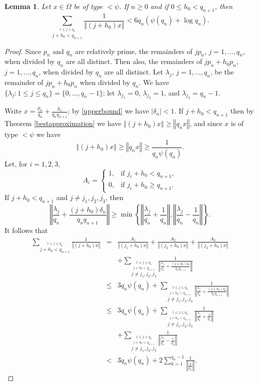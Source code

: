 \documentclass{article}
\newcommand{\norm}[1]{\left\Vert #1 \right\Vert}
\newtheorem{lemma}[theorem]{Lemma}
\begin{document}
\begin{lemma}
Let $x \in \Omega$ be of type $< \psi$. If $n \geq 0$ and if $0 \leq h_0 < q_{n+1}$, then
\[
\sum_{\stackrel{1 \leq j \leq q_n}{j+h_0<q_{n+1}}} \frac{1}{\norm{(j+h_0)x}} < 6 q_n(\psi(q_n)+\log q_n).
\]
\label{h0}
\end{lemma}
\begin{proof}
Since $p_n$ and $q_n$ are relatively prime, 
the remainders of $j p_n$, $j=1,\ldots,q_n$, when divided by $q_n$ are all distinct.
Then also, the remainders of $j p_n+h_0 p_n$, $j=1,\ldots,q_n$, when divided by $q_n$ are all distinct. Let $\lambda_j$, $j=1,\ldots,q_n$, be the remainder of $jp_n+
h_0p_n$  when divided by $q_n$. We have $\{\lambda_j: 1 \leq j \leq q_n\}=\{0,\ldots,q_n-1\}$; let $\lambda_{j_1}=0$, $\lambda_{j_2}=1$, and $\lambda_{j_3}=q_n-1$.


Write $x=\frac{p_n}{q_n}+\frac{\delta_n}{q_n q_{n+1}}$; by \eqref{upperbound} we have $|\delta_n|<1$. If $j+h_0<q_{n+1}$ then by
Theorem \ref{bestapproximation} we have $\norm{(j+h_0)x} \geq \norm{q_n x}$, 
and since $x$ is of type $<\psi$ we have
\[
\norm{(j+h_0)x} \geq \norm{q_n x} \geq \frac{1}{q_n \psi(q_n)}.
\] 
Let, for $i=1,2,3$,
\[
A_i=\begin{cases}
1,&\textrm{if $j_i+h_0<q_{n+1}$},\\
0,&\textrm{if $j_i+h_0 \geq q_{n+1}$}.
\end{cases}
\]
If $j+h_0<q_{n+1}$ and $j \neq j_1,j_2,j_3$, then 
\[\norm{\frac{\lambda_j}{q_n}+\frac{(j+h_0)\delta_n}{q_n q_{n+1}}} \geq \min \left\{ \norm{\frac{\lambda_j}{q_n}+\frac{1}{q_n}},\norm{\frac{\lambda_j}{q_n}-\frac{1}{q_n}}  \right\}.
\]
It follows that
\begin{eqnarray*}
\sum_{\stackrel{1 \leq j \leq q_n}{j+h_0<q_{n+1}}} \frac{1}{\norm{(j+h_0)x}}
&=&
\frac{A_1}{\norm{(j_1+h_0)x}}
+
\frac{A_2}{\norm{(j_2+h_0)x}}
+\frac{A_3}{\norm{(j_3+h_0)x}}\\
&&+
\sum_{\stackrel{1 \leq j \leq q_n}{\stackrel{j+h_0<q_{n+1}}{j \neq j_1, j_2, j_3}}} \frac{1}{\norm{\frac{\lambda_j}{q_n}+\frac{(j+h_0)\delta_n}{q_n q_{n+1}}}}\\
&\leq&3q_n\psi(q_n)+\sum_{\stackrel{1 \leq j \leq q_n}{\stackrel{j+h_0<q_{n+1}}{j \neq j_1, j_2, j_3}}} \frac{1}{\norm{\frac{\lambda_j}{q_n}+\frac{(j+h_0)\delta_n}{q_n q_{n+1}}}}\\
&\leq&3q_n\psi(q_n)+\sum_{\stackrel{1 \leq j \leq q_n}{\stackrel{j+h_0<q_{n+1}}{j \neq j_1, j_2, j_3}}} \frac{1}{\norm{\frac{\lambda_j}{q_n}+\frac{1}{q_n}}}\\
&&+\sum_{\stackrel{1 \leq j \leq q_n}{\stackrel{j+h_0<q_{n+1}}{j \neq j_1, j_2, j_3}}} \frac{1}{\norm{\frac{\lambda_j}{q_n}-\frac{1}{q_n}}}\\
&<&3q_n\psi(q_n)+2\sum_{k=1}^{q_n-1} \frac{1}{\norm{\frac{k}{q_n}}}.
\end{eqnarray*}




\end{proof}
\end{document}
